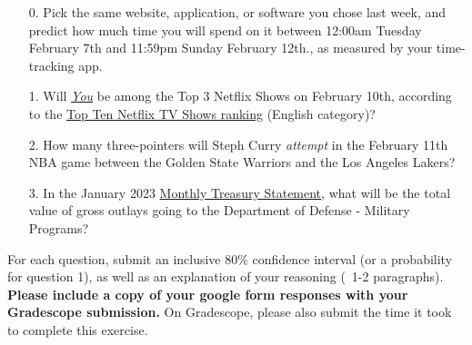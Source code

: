 \documentclass[11pt]{article}
\begin{document}
\begin{enumerate}
	\item[0.] Pick the same website, application, or software you chose last week, and predict how much time you will spend on it between 12:00am Tuesday February 7th and 11:59pm Sunday February 12th., as measured by your time-tracking app.

	\item[1.] Will \href{https://en.wikipedia.org/wiki/You_(TV_series)}{\emph{You}} be among the Top 3 Netflix Shows on February 10th, according to the \href{https://top10.netflix.com/tv}{Top Ten Netflix TV Shows ranking} (English category)?
	
	\item[2.] How many three-pointers will Steph Curry \emph{attempt} in the February 11th NBA game between the Golden State Warriors and the Los Angeles Lakers?
 
	\item[3.] In the January 2023 \href{https://fiscal.treasury.gov/reports-statements/mts/}{Monthly Treasury Statement}, what will be the total value of gross outlays going to the Department of Defense - Military Programs?
	
\end{enumerate}

For each question, submit an inclusive 80\% confidence interval (or a probability for question 1), as well as an explanation of your reasoning (~1-2 paragraphs). \textbf{Please include a copy of your google form responses with your Gradescope submission.} On Gradescope, please also submit the time it took to complete this exercise.
\end{document}
